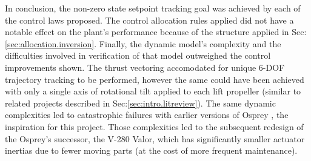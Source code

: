 \par
In conclusion, the non-zero state setpoint tracking goal was achieved by each of the control laws proposed. The control allocation rules applied did not have a notable effect on the plant's performance because of the structure applied in Sec:\ref{sec:allocation.inversion}. Finally, the dynamic model's complexity and the difficulties involved in verification of that model outweighed the control improvements shown. The thrust vectoring accomodated for unique 6-DOF trajectory tracking to be performed, however the same could have been achieved with only a single axis of rotational tilt applied to each lift propeller (similar to related projects described in Sec:\ref{sec:intro.litreview}). The same dynamic complexities led to catastrophic failures with earlier versions of Osprey \cite{ospreywired}, the inspiration for this project. Those complexities led to the subsequent redesign of the Osprey's successor, the V-280 Valor, which has significantly smaller actuator inertias due to fewer moving parts (at the cost of more frequent maintenance).